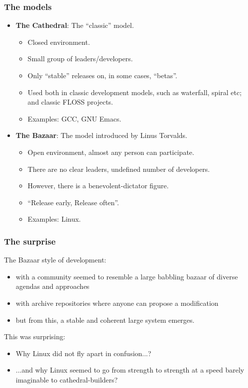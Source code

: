 \documentclass{beamer}
\begin{document}
\begin{frame}
\frametitle{The models}

\begin{itemize}
\item {\bf The Cathedral}: The ``classic'' model.
\begin{itemize}
\item Closed environment.
\item Small group of leaders/developers.
\item Only ``stable'' releases on, in some cases, ``betas''.
\item Used both in classic development models, such as waterfall, spiral etc;
  and classic FLOSS projects.
\item Examples: GCC, GNU Emacs.
\end{itemize}

\item {\bf The Bazaar}: The model introduced by Linus Torvalds.
\begin{itemize}
\item Open environment, almost any person can participate.
\item There are no clear leaders, undefined number of developers.
\item However, there is a benevolent-dictator figure.
\item ``Release early, Release often''.
\item Examples: Linux.
\end{itemize}
\end{itemize}

\end{frame}

\begin{frame}
\frametitle{The surprise}

The Bazaar style of development:
\begin{itemize}
\item with a community seemed to resemble a large babbling bazaar of
  diverse agendas and approaches
\item with archive repositories where anyone can propose a
  modification
\item but from this, a stable and coherent large system emerges.
\end{itemize}

This was surprising:
\begin{itemize}
\item Why Linux did not fly apart in confusion...?
\item ...and why Linux seemed to go from strength to strength at a speed
  barely imaginable to cathedral-builders?
\end{itemize}

\end{frame}
\end{document}
